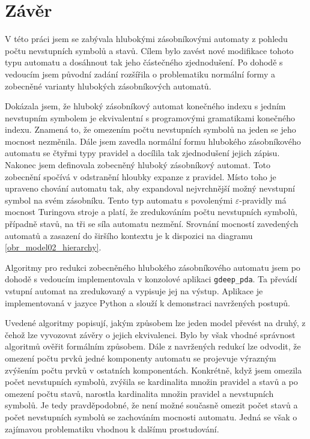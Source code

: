 \chapter{Závěr}

V této práci jsem se zabývala hlubokými zásobníkovými automaty z pohledu počtu nevstupních symbolů a stavů. Cílem bylo zavést nové modifikace tohoto typu automatu a dosáhnout tak jeho částečného zjednodušení. Po dohodě s vedoucím jsem původní zadání rozšířila o problematiku normální formy a zobecněné varianty hlubokých zásobníkových automatů.

Dokázala jsem, že hluboký zásobníkový automat konečného indexu s jedním nevstupním symbolem je ekvivalentní s programovými gramatikami konečného indexu. Znamená to, že omezením počtu nevstupních symbolů na jeden se jeho mocnost nezměnila.  Dále jsem zavedla normální formu hlubokého zásobníkového automatu se čtyřmi typy pravidel a docílila tak zjednodušení jejich zápisu. Nakonec jsem definovala zobecněný hluboký zásobníkový automat. Toto zobecnění spočívá v odstranění hloubky expanze z pravidel. Místo toho je upraveno chování automatu tak, aby expandoval nejvrchnější možný nevstupní symbol na svém zásobníku. Tento typ automatu s povolenými $\varepsilon$-pravidly má mocnost Turingova stroje a platí, že zredukováním počtu nevstupních symbolů, případně stavů, na tři se síla automatu nezmění. Srovnání mocností zavedených automatů a zasazení do širšího kontextu je k dispozici na diagramu \ref{obr_model02_hierarchy}.


Algoritmy pro redukci zobecněného hlubokého zásobníkového automatu jsem po dohodě s vedoucím implementovala v konzolové aplikaci \texttt{gdeep\_pda}. Ta převádí vstupní automat na zredukovaný a vypisuje jej na výstup. Aplikace je implementovaná v jazyce Python a slouží k demonstraci navržených postupů. 

Uvedené algoritmy popisují, jakým způsobem lze jeden model převést na druhý, z čehož lze vyvozovat závěry o jejich ekvivalenci. Bylo by však vhodné  správnost algoritmů ověřit formálním způsobem. Dále z navržených redukcí lze odvodit, že omezení počtu prvků jedné komponenty automatu se projevuje výrazným zvýšením počtu prvků v ostatních komponentách. Konkrétně, když jsem omezila počet nevstupních symbolů, zvýšila se kardinalita množin pravidel a stavů a po omezení počtu stavů, narostla kardinalita množin pravidel a nevstupních symbolů. Je tedy pravděpodobné, že není možné současně omezit počet stavů a počet nevstupních symbolů se zachováním mocnosti automatu. Jedná se však o zajímavou problematiku vhodnou k dalšímu prostudování.



